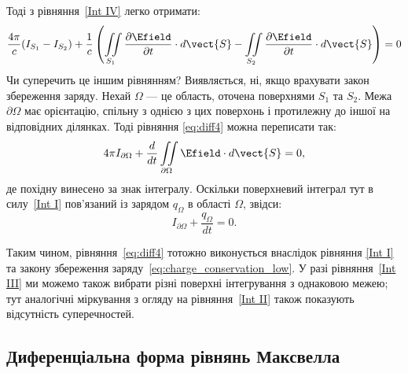 Тоді з рівняння~\eqref{Int IV} легко отримати:
\begin{equation}\label{eq:diff4}
	\frac{4\pi}c(I_{S_1} - I_{S_2}) +\frac1c \left( \iint\limits_{S_1}
	\frac{\partial\Efield}{\partial t}\cdot d\vect{S}  - \iint\limits_{S_2}
	\frac{\partial\Efield}{\partial t}\cdot d\vect{S}  \right) = 0
\end{equation}
Чи суперечить це іншим рівнянням? Виявляється, ні, якщо врахувати закон збереження заряду. Нехай $\Omega$ --- це область, оточена поверхнями $S_1$ та
$S_2$. Межа $\partial\Omega$ має орієнтацію, спільну з однією з цих поверхонь і протилежну до іншої на відповідних ділянках. Тоді рівняння
\eqref{eq:diff4} можна переписати так:
\begin{equation}
	4\pi I_{\partial\Omega} + \frac{d}{dt} \iint\limits_{\partial\Omega} \Efield\cdot d\vect{S} = 0,
\end{equation}
де похідну винесено за знак інтегралу. Оскільки поверхневий інтеграл тут в силу~\eqref{Int I} пов’язаний із зарядом $q_{\Omega}$ в області $\Omega$,
звідси:
\begin{equation}\label{eq:charge_conservation_low}
	I_{\partial\Omega} + \frac{q_{\Omega}}{dt} = 0.
\end{equation}

Таким чином, рівняння~\eqref{eq:diff4} тотожно виконується внаслідок рівняння
\eqref{Int I} та закону збереження заряду~\eqref{eq:charge_conservation_low}.
У разі рівняння~\eqref{Int III} ми можемо також вибрати різні поверхні
інтегрування з однаковою межею; тут аналогічні міркування з огляду на
рівняння~\eqref{Int II} також показують відсутність суперечностей.


\subsection*{Диференціальна форма рівнянь Максвелла}


